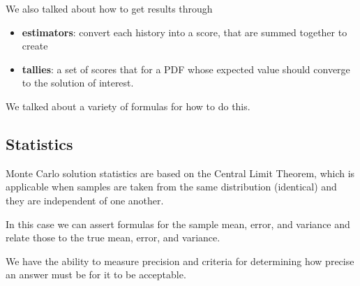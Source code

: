 \documentclass[12pt]{article}
\begin{document}
We also talked about how to get results through 
\begin{itemize}
\item \textbf{estimators}: convert each history into a score, that are summed together to create 
\item \textbf{tallies}: a set of scores that for a PDF whose expected value should converge to the solution of interest.
\end{itemize}

We talked about a variety of formulas for how to do this. 


\subsection*{Statistics}

Monte Carlo solution statistics are based on the Central Limit Theorem, which is applicable when samples are taken from the same distribution (identical) and they are independent of one another. 

In this case we can assert formulas for the sample mean, error, and variance and relate those to the true mean, error, and variance. 

We have the ability to measure precision and criteria for determining how precise an answer must be for it to be acceptable. 
\end{document}
